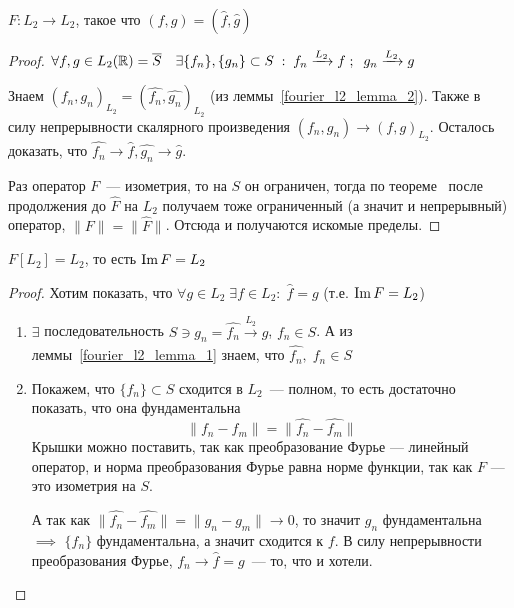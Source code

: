 \begin{theorem}[1]
    $F\!: L_2 \to L_2$, такое что $(f, g)=(\widehat{f}, \widehat{g})$
\end{theorem}

\begin{proof}
    $\forall f,g \in L_2(\mathbb{R}) = \overline{S} \quad \exists \{f_n\}, \{g_n\} \subset S \; : \; f_n \xrightarrow[]{L_2} f \;;\;\; g_n \xrightarrow[]{L_2} g$

    Знаем $(f_n, g_n)_{L_2}=(\widehat{f_n}, \widehat{g_n})_{L_2}$ (из леммы~\ref{fourier_l2_lemma_2}). Также в силу непрерывности скалярного произведения $(f_n, g_n) \to (f,g)_{L_2}$. Осталось доказать, что $\widehat{f_n} \to \widehat{f}, \widehat{g_n} \to \widehat{g}$.
    
    Раз оператор $F$~--- изометрия, то на $S$ он ограничен, тогда по теореме~ после продолжения до $\widehat{F}$ на $L_2$ получаем тоже ограниченный (а значит и непрерывный) оператор, $\| F\| = \|\widehat{F}\|$. Отсюда и получаются искомые пределы.
\end{proof}

\begin{theorem}[2]
    $F[L_2] = L_2$, то есть $\operatorname{Im} F = L_2$
\end{theorem}

\begin{proof}
    Хотим показать, что $\forall g \in L_2 \; \exists f \in L_2\!: \; \widehat{f}=g$ (т.е. $\operatorname{Im} F = L_2$)
    \begin{enumerate}
        \item $\exists$ последовательность $S \ni g_n=\widehat{f_n} \xrightarrow[]{L_2} g$, $f_n \in S$. А из леммы~\ref{fourier_l2_lemma_1} знаем, что $\widehat{f_n}, \; f_n \in S$
        \item Покажем, что $\{f_n\} \subset S$ сходится в $L_2$~--- полном, то есть достаточно показать, что она фундаментальна
        \[ \| f_n - f_m \| = \| \widehat{f_n} - \widehat{f_m} \|\]
        Крышки можно поставить, так как преобразование Фурье --- линейный оператор, и норма преобразования Фурье равна норме функции, так как $F$ --- это изометрия на $S$.
        
        А так как $ \| \widehat{f_n} - \widehat{f_m} \| = \|g_n - g_m\| \to 0$, то значит $g_n$ фундаментальна $\implies$ $\{f_n\}$ фундаментальна, а значит сходится к $f$.
        В силу непрерывности преобразования Фурье, $\widehat{f_n} \to \widehat{f} = g$~--- то, что и хотели.
    \end{enumerate}
\end{proof}

